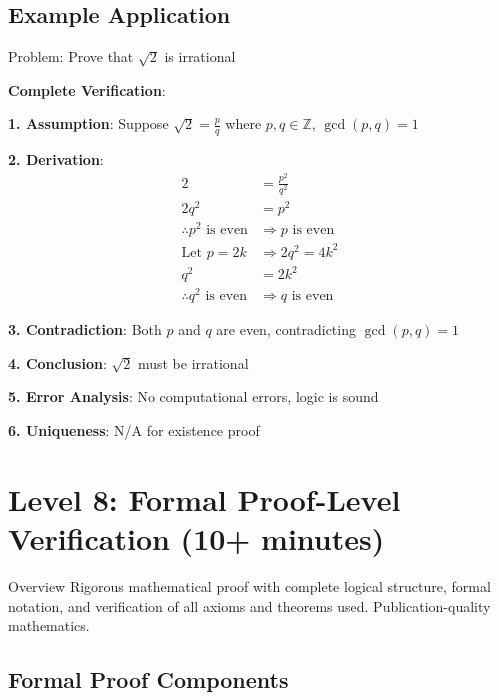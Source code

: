\documentclass{article}
\begin{document}
\subsection{Example Application}

\begin{completebox}{Problem: Prove that $\sqrt{2}$ is irrational}

\textbf{Complete Verification}:

\textbf{1. Assumption}: Suppose $\sqrt{2} = \frac{p}{q}$ where $p,q \in \mathbb{Z}$, $\gcd(p,q) = 1$

\textbf{2. Derivation}: 
\begin{align}
2 &= \frac{p^2}{q^2}\\
2q^2 &= p^2\\
\therefore p^2 \text{ is even} &\Rightarrow p \text{ is even}\\
\text{Let } p = 2k &\Rightarrow 2q^2 = 4k^2\\
q^2 &= 2k^2\\
\therefore q^2 \text{ is even} &\Rightarrow q \text{ is even}
\end{align}

\textbf{3. Contradiction}: Both $p$ and $q$ are even, contradicting $\gcd(p,q) = 1$

\textbf{4. Conclusion}: $\sqrt{2}$ must be irrational \checkmark

\textbf{5. Error Analysis}: No computational errors, logic is sound

\textbf{6. Uniqueness}: N/A for existence proof
\end{completebox}

\newpage

\section{Level 8: Formal Proof-Level Verification (10+ minutes)}

\begin{formalbox}{Overview}
Rigorous mathematical proof with complete logical structure, formal notation, and verification of all axioms and theorems used. Publication-quality mathematics.
\end{formalbox}

\subsection{Formal Proof Components}
\end{document}
